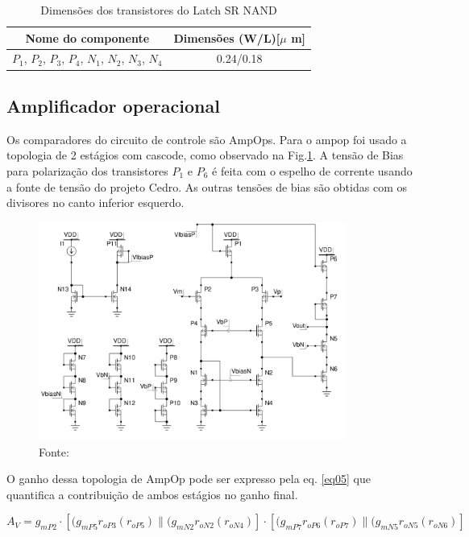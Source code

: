 \begin{table}[htb]
\centering
\begin{tabular}{c|c}
\hline 
\hline 
\textbf{Nome do componente} & \textbf{Dimensões (W/L)[$\mu$ m]} \\ 
\hline 
\hline 
$P_1$, $P_2$, $P_3$, $P_4$, $N_1$, $N_2$, $N_3$, $N_4$  & 0.24/0.18 \\ 
\hline 
\end{tabular} 
\caption{Dimensões dos transistores do Latch SR NAND}
\label{tab:latch}
\end{table}

\subsection{Amplificador operacional}

Os comparadores do circuito de controle são AmpOps. Para o ampop foi usado a topologia de 2 estágios com cascode, como observado na Fig.\ref{fig16}. A tensão de Bias para polarização dos transistores $P_1$ e $P_6$ é feita com o espelho de corrente usando a fonte de tensão do projeto Cedro. As outras tensões de bias são obtidas com os divisores no canto inferior esquerdo. 

\begin{figure}[htb]
	\centering
	\includegraphics[width=0.9\textwidth]{figuras/ampop.png}
	\caption{ Fonte:\cite{cmos_analog} }
	\label{fig16}
\end{figure}

O ganho dessa topologia de AmpOp pode ser expresso pela eq. \ref{eq05} que quantifica a contribuição de ambos estágios no ganho final.


\begin{equation}
 A_V = g_{mP2}\cdot[(g_{mP5}r_{oP3}(r_{oP5})\parallel(g_{mN2}r_{oN2}(r_{oN4})]\cdot[(g_{mP7}r_{oP6}(r_{oP7})\parallel(g_{mN5}r_{oN5}(r_{oN6})]
 \label{eq05}
\end{equation}

